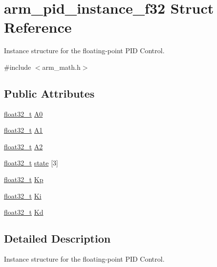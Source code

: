 \hypertarget{structarm__pid__instance__f32}{}\section{arm\+\_\+pid\+\_\+instance\+\_\+f32 Struct Reference}
\label{structarm__pid__instance__f32}


Instance structure for the floating-\/point P\+ID Control.  




{\ttfamily \#include $<$arm\+\_\+math.\+h$>$}

\subsection*{Public Attributes}
\begin{DoxyCompactItemize}
\item 
\hyperlink{arm__math_8h_a4611b605e45ab401f02cab15c5e38715}{float32\+\_\+t} \hyperlink{structarm__pid__instance__f32_ad7b0bed64915d0a25a3409fa2dc45556}{A0}
\item 
\hyperlink{arm__math_8h_a4611b605e45ab401f02cab15c5e38715}{float32\+\_\+t} \hyperlink{structarm__pid__instance__f32_a7def89571c50f7137a213326a396e560}{A1}
\item 
\hyperlink{arm__math_8h_a4611b605e45ab401f02cab15c5e38715}{float32\+\_\+t} \hyperlink{structarm__pid__instance__f32_a155acf642ba2f521869f19d694cd7fa0}{A2}
\item 
\hyperlink{arm__math_8h_a4611b605e45ab401f02cab15c5e38715}{float32\+\_\+t} \hyperlink{structarm__pid__instance__f32_afd394e1e52fb1d526aa472c83b8f2464}{state} \mbox{[}3\mbox{]}
\item 
\hyperlink{arm__math_8h_a4611b605e45ab401f02cab15c5e38715}{float32\+\_\+t} \hyperlink{structarm__pid__instance__f32_aa9b9aa9e413c6cec376a9dddc9f01ebe}{Kp}
\item 
\hyperlink{arm__math_8h_a4611b605e45ab401f02cab15c5e38715}{float32\+\_\+t} \hyperlink{structarm__pid__instance__f32_ac0feffde05fe391eeab3bf78e953830a}{Ki}
\item 
\hyperlink{arm__math_8h_a4611b605e45ab401f02cab15c5e38715}{float32\+\_\+t} \hyperlink{structarm__pid__instance__f32_ad5b68fbf84d16188ae4747ff91f6f088}{Kd}
\end{DoxyCompactItemize}


\subsection{Detailed Description}
Instance structure for the floating-\/point P\+ID Control. 

